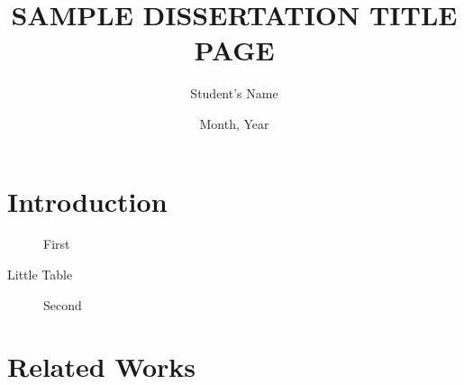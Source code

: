 \documentclass{unophd}
\title{SAMPLE DISSERTATION TITLE PAGE}
\author{Student's Name}
\date{Month, Year}
\begin{document}
\maketitle

\makeabstract

\tableofcontents


\listoffigtab

\chapter{Introduction}


\begin{figure}[!b]
	\caption{First}
\end{figure}

\begin{table}[!b]
	\caption{Little Table}
\end{table}

\begin{figure}[!b]
	\caption{Second}
\end{figure}

\chapter{Related Works}
\end{document}
